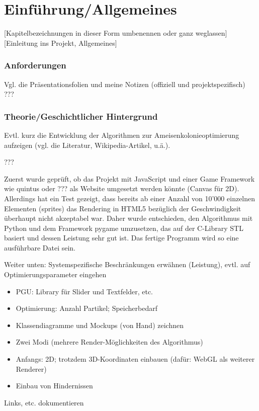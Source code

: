 
\chapter{Einführung/Allgemeines}

[Kapitelbezeichnungen in dieser Form umbenennen oder ganz weglassen] \\

[Einleitung ins Projekt, Allgemeines]


\subsection{Anforderungen}

Vgl. die Präsentationsfolien und meine Notizen (offiziell und projektspezifisch) \\
 
???


\subsection{Theorie/Geschichtlicher Hintergrund} 

Evtl. kurz die Entwicklung der Algorithmen zur Ameisenkolonieoptimierung aufzeigen (vgl. die Literatur, Wikipedia-Artikel, u.ä.).

???


\vspace*{1cm}

Zuerst wurde geprüft, ob das Projekt mit JavaScript und einer Game Framework wie quintus oder ??? als Website umgesetzt werden könnte (Canvas für 2D). Allerdings hat ein Test gezeigt, dass bereits ab einer Anzahl von 10'000 einzelnen Elementen (sprites) das Rendering in HTML5 bezüglich der Geschwindigkeit überhaupt nicht akzeptabel war. Daher wurde entschieden, den Algorithmus mit Python und dem Framework pygame umzusetzen, das auf der C-Library STL basiert und dessen Leistung sehr gut ist. Das fertige Programm wird so eine ausführbare Datei sein.

\vspace*{1cm}

Weiter unten: Systemspezifische Beschränkungen erwähnen (Leistung), evtl. auf Optimierungsparameter eingehen

\vspace*{1cm} 

\begin{itemize}[noitemsep]
\item PGU: Library für Slider und Textfelder, etc.
\item Optimierung: Anzahl Partikel; Speicherbedarf
\item Klassendiagramme und Mockups (von Hand) zeichnen
\item Zwei Modi (mehrere Render-Möglichkeiten des Algorithmus)
\item Anfangs: 2D; trotzdem 3D-Koordinaten einbauen (dafür: WebGL als weiterer Renderer)
\item Einbau von Hindernissen
\end{itemize}


Links, etc. dokumentieren


\vspace*{1cm}
